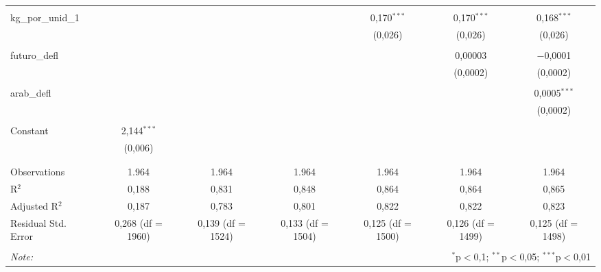 \begin{table}[!htbp]
\begin{tabular}{@{\extracolsep{5pt}}lcccccc}
  & & & & & & \\ 
 kg\_por\_unid\_1 &  &  &  & 0,170$^{***}$ & 0,170$^{***}$ & 0,168$^{***}$ \\ 
  &  &  &  & (0,026) & (0,026) & (0,026) \\ 
  & & & & & & \\ 
 futuro\_defl &  &  &  &  & 0,00003 & $-$0,0001 \\ 
  &  &  &  &  & (0,0002) & (0,0002) \\ 
  & & & & & & \\ 
 arab\_defl &  &  &  &  &  & 0,0005$^{***}$ \\ 
  &  &  &  &  &  & (0,0002) \\ 
  & & & & & & \\ 
 Constant & 2,144$^{***}$ &  &  &  &  &  \\ 
  & (0,006) &  &  &  &  &  \\ 
  & & & & & & \\ 
\hline \\[-1.8ex] 
Observations & 1.964 & 1.964 & 1.964 & 1.964 & 1.964 & 1.964 \\ 
R$^{2}$ & 0,188 & 0,831 & 0,848 & 0,864 & 0,864 & 0,865 \\ 
Adjusted R$^{2}$ & 0,187 & 0,783 & 0,801 & 0,822 & 0,822 & 0,823 \\ 
Residual Std. Error & 0,268 (df = 1960) & 0,139 (df = 1524) & 0,133 (df = 1504) & 0,125 (df = 1500) & 0,126 (df = 1499) & 0,125 (df = 1498) \\ 
\hline 
\hline \\[-1.8ex] 
\textit{Note:}  & \multicolumn{6}{r}{$^{*}$p$<$0,1; $^{**}$p$<$0,05; $^{***}$p$<$0,01} \\ 
\end{tabular} 
\end{table} 
